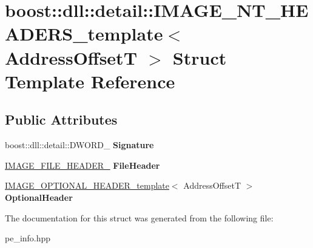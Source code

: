 \hypertarget{a00148}{}\section{boost\+:\+:dll\+:\+:detail\+:\+:I\+M\+A\+G\+E\+\_\+\+N\+T\+\_\+\+H\+E\+A\+D\+E\+R\+S\+\_\+template$<$ Address\+OffsetT $>$ Struct Template Reference}
\label{a00148}
\subsection*{Public Attributes}
\begin{DoxyCompactItemize}
\item 
boost\+::dll\+::detail\+::\+D\+W\+O\+R\+D\+\_\+ {\bfseries Signature}\hypertarget{a00148_ac62094a288f7e0758fd819727d23d86a}{}\label{a00148_ac62094a288f7e0758fd819727d23d86a}

\item 
\hyperlink{a00147}{I\+M\+A\+G\+E\+\_\+\+F\+I\+L\+E\+\_\+\+H\+E\+A\+D\+E\+R\+\_\+} {\bfseries File\+Header}\hypertarget{a00148_af79e113f2e6d6dfc51c8310417334b38}{}\label{a00148_af79e113f2e6d6dfc51c8310417334b38}

\item 
\hyperlink{a00149}{I\+M\+A\+G\+E\+\_\+\+O\+P\+T\+I\+O\+N\+A\+L\+\_\+\+H\+E\+A\+D\+E\+R\+\_\+template}$<$ Address\+OffsetT $>$ {\bfseries Optional\+Header}\hypertarget{a00148_a11d7a5f9756d15ce28dd47805a89ad0d}{}\label{a00148_a11d7a5f9756d15ce28dd47805a89ad0d}

\end{DoxyCompactItemize}


The documentation for this struct was generated from the following file\+:\begin{DoxyCompactItemize}
\item 
pe\+\_\+info.\+hpp\end{DoxyCompactItemize}
